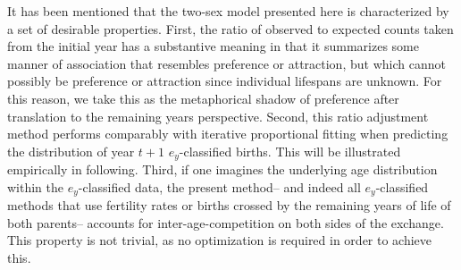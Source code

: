 
It has been mentioned that the two-sex model presented here is characterized by
a set of desirable properties. First, the ratio of observed to expected counts
taken from the initial year has a substantive meaning in that it summarizes
some manner of association that resembles preference or attraction, but which
cannot possibly be preference or attraction since individual lifespans are
unknown. For this reason, we take this as the metaphorical shadow of preference
after translation to the remaining years perspective. Second, this ratio adjustment 
method performs comparably with iterative proportional fitting when
predicting the distribution of year $t+1$ $e_y$-classified births. This will be illustrated
 empirically in following. Third, if one imagines the underlying age
 distribution within the $e_y$-classified data, the present method-- and indeed
all $e_y$-classified methods that use fertility rates or births crossed by the
remaining years of life of both parents-- accounts for
inter-age-competition on both sides of the exchange. This property is not
trivial, as no optimization is required in order to achieve this. 






